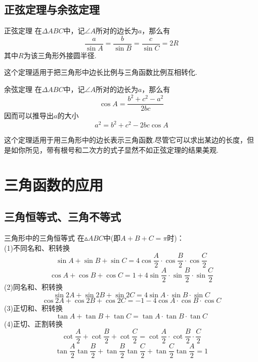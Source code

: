 \documentclass[lang=cn, zihao=5]{elegantbook}
\begin{document}
\subsection{正弦定理与余弦定理}

\begin{theorem}{正弦定理} %
    在$\Delta ABC$中，记$\angle A$所对的边长为$a$，那么有$$\frac{a}{\sin{A}}=\frac{b}{\sin{B}}=\frac{c}{\sin{C}}=2R$$其中$R$为该三角形外接圆半径.
\end{theorem}
这个定理适用于把三角形中边长比例与三角函数比例互相转化.

\begin{theorem}{余弦定理} %
    在$\Delta ABC$中，记$\angle A$所对的边长为$a$，那么有$$\cos{A}=\frac{b^2+c^2-a^2}{2bc}$$
    因而可以推导出$a$的大小$$a^2=b^2+c^2-2bc \cos{A}$$
\end{theorem}
这个定理适用于用三角形中的边长表示三角函数.尽管它可以求出某边的长度，但是如你所见，带有根号和二次方的式子显然不如正弦定理的结果美观.

\section{三角函数的应用}

\subsection{三角恒等式、三角不等式}

\begin{proposition}{三角形中的三角恒等式} %
    在$\vartriangle ABC$中(即$A+B+C=\pi$时)：\\
    (1)不同名和、积转换
    $$\sin A + \sin B + \sin C = 4 \cos \frac{A}{2} \cdot \cos \frac{B}{2} \cdot \cos \frac{C}{2}$$
    $$\cos A + \cos B + \cos C = 1 + 4 \sin \frac{A}{2} \cdot \sin \frac{B}{2} \cdot \sin \frac{C}{2}$$
    (2)同名和、积转换
    $$\sin 2A + \sin 2B + \sin 2C = 4\sin A \cdot \sin B \cdot \sin C$$
    $$\cos 2A + \cos 2B + \cos 2C = -1 - 4\cos A \cdot \cos B \cdot \cos C$$
    (3)正切和、积转换
    $$\tan A + \tan B + \tan C = \tan A \cdot \tan B \cdot \tan C$$
    (4)正切、正割转换
    $$\cot \frac{A}{2} + \cot \frac{B}{2} + \cot \frac{C}{2} = \cot \frac{A}{2} \cdot \cot \frac{B}{2} \cdot \frac{C}{2}$$
    $$\tan \frac{A}{2} \tan \frac{B}{2} + \tan \frac{B}{2} \tan \frac{C}{2} + \tan \frac{C}{2} \tan \frac{A}{2} = 1$$
\end{proposition}
\end{document}
